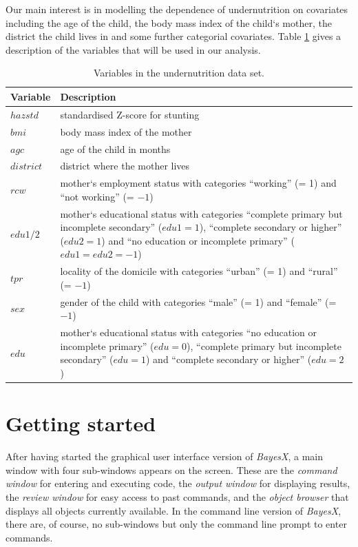 Our main interest is in modelling the dependence of undernutrition on covariates including the age of the child, the body mass
index of the child`s mother, the district the child lives in and some further categorial covariates. Table \ref{step:zambiavar}
gives a description of the variables that will be used in our analysis.

{\footnotesize
\begin{table}[ht]
\begin{center}
\begin{tabular}{lp{12.5cm}}
 \hline
 {\bf Variable} & {\bf Description}\\
 \hline
 $\mathit hazstd$ & standardised Z-score for stunting\\
 $\mathit bmi$ & body mass index of the mother\\
 $\mathit agc$ & age of the child in months\\
 $\mathit district$ & district where the mother lives\\
 $\mathit rcw$ & mother`s employment status with categories ``working'' (= 1) and ``not working'' (= $-1$)\\
 $\mathit edu1/2$ & mother`s educational status with categories ``complete primary but incomplete secondary'' ($edu1=1$), ``complete secondary or higher'' ($edu2=1$) and ``no education or incomplete primary'' ($edu1=edu2=-1$)\\
 $\mathit tpr$ & locality of the domicile with categories ``urban'' (= 1) and ``rural'' (= $-1$)\\
 $\mathit sex$ & gender of the child with categories ``male'' (= 1) and  ``female'' (= $-1$)\\
 $\mathit edu$ & mother`s educational status with categories  ``no education or incomplete primary'' ($edu=0$),
 ``complete primary but incomplete secondary'' ($edu=1$) and
 ``complete secondary or higher'' ($edu=2$) \\
 \hline
\end{tabular}
{\it\caption{Variables in the undernutrition data set. \label{step:zambiavar}}}
\end{center}
\end{table}}

\section{Getting started}\label{step:usage}

After having started the graphical user interface version of {\it BayesX}, a main window with four sub-windows appears on the
screen. These are the {\it command window} for entering and executing code, the {\it output window} for displaying results, the
{\it review window} for easy access to past commands, and the {\it object browser} that displays all objects currently
available. In the command line version of {\it BayesX}, there are, of course, no sub-windows but only the command line prompt to
enter commands.

